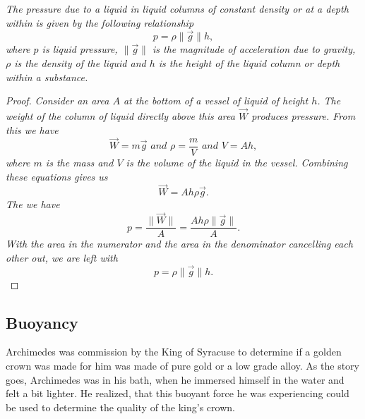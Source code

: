 \begin{theorem}
\textit{The pressure due to a liquid in liquid columns of constant density or at a depth within is given by the following relationship}
\begin{equation}
    p = \rho \| \vec{g} \| h,
\end{equation}
\textit{where $p$ is liquid pressure, $\| \vec{g} \|$ is the magnitude of acceleration due to gravity, $\rho$ is the density of the liquid and $h$ is the height of the liquid column or depth within a substance.}
\begin{proof}
\textit{Consider an area $A$ at the bottom of a vessel of liquid of height $h$. The weight of the column of liquid directly above this area $\vec{W}$ produces pressure. From this we have}
\begin{equation*}
    \vec{W} = m\vec{g} \textit{ and } \rho = \frac{m}{V} \textit{ and } V = Ah,
\end{equation*}
\textit{where $m$ is the mass and $V$ is the volume of the liquid in the vessel. Combining these equations gives us}
\begin{equation*}
    \vec{W} = A h \rho \vec{g}. 
\end{equation*}
\textit{The we have}
\begin{equation*}
    p = \frac{\| \vec{W} \|}{A} = \frac{Ah\rho \| \vec{g} \|}{A}.
\end{equation*}
\textit{With the area in the numerator and the area in the denominator cancelling each other out, we are left with}
\begin{equation*}
    p = \rho \| \vec{g} \| h.
\end{equation*}
\end{proof}
\end{theorem}

\subsection{Buoyancy}

Archimedes was commission by the King of Syracuse to determine if a golden crown was made for him was made of pure gold or a low grade alloy. As the story goes, Archimedes was in his bath, when he immersed himself in the water and felt a bit lighter. He realized, that this buoyant force he was experiencing could be used to determine the quality of the king's crown. 


